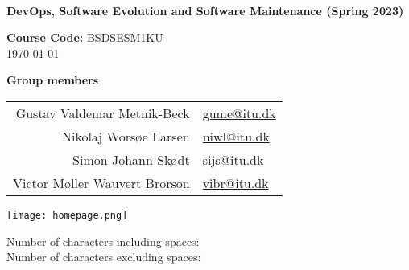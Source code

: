 \begin{titlepage}
    \begin{center}
        \\[0.5cm]
        
        \huge
        \textbf{DevOps, Software Evolution and Software Maintenance (Spring 2023)}\\
        \vspace{0.5cm}

        \Large
        \textbf{Course Code:} BSDSESM1KU\\[0.5cm]
        \large
        \today

        \vspace{1.0cm}
        
        \textbf{Group members}\\[0.2cm]
        \begin{tabular}{r l}
            Gustav Valdemar Metnik-Beck   & \href{mailto:gume@itu.dk}{gume@itu.dk}\\
            Nikolaj Worsøe Larsen         & \href{mailto:niwl@itu.dk}{niwl@itu.dk}\\
            Simon Johann Skødt            & \href{mailto:sijs@itu.dk}{sijs@itu.dk}\\
            Victor Møller Wauvert Brorson & \href{mailto:vibr@itu.dk}{vibr@itu.dk}      
        \end{tabular}

        \texttt{[image: homepage.png]}
        

        \normalsize
        Number of characters including spaces: \\
        Number of characters excluding spaces: 
    \end{center}
\end{titlepage}